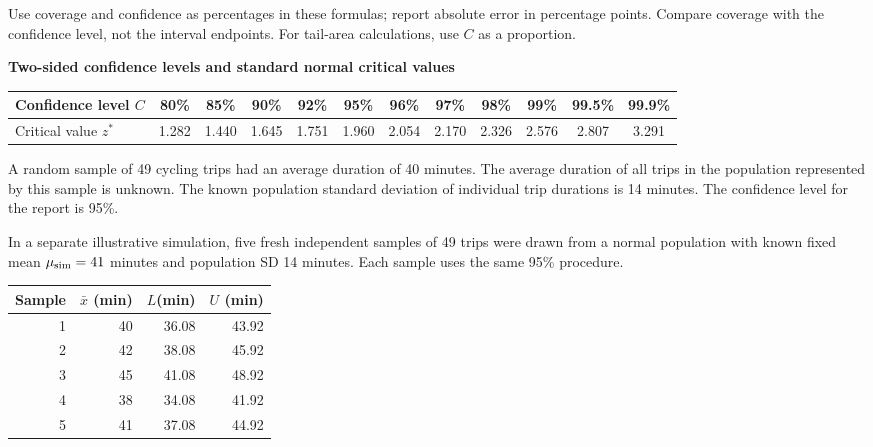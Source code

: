Use coverage and confidence as percentages in these formulas; report absolute error in percentage points. Compare coverage with the confidence level, not the interval endpoints. For tail-area calculations, use $C$ as a proportion.
\begin{center}
\small
\textbf{Two-sided confidence levels and standard normal critical values}\par
\begin{tabularx}{\linewidth}{@{}>{\raggedright\arraybackslash}X*{11}{c}@{}}\toprule
Confidence level $C$&80\%&85\%&90\%&92\%&95\%&96\%&97\%&98\%&99\%&99.5\%&99.9\%\\\midrule
Critical value $z^*$&1.282&1.440&1.645&1.751&1.960&2.054&2.170&2.326&2.576&2.807&3.291\\\bottomrule
\end{tabularx}\end{center}






\InformationTask

\IntervalTask

\CoverageTask

\clearpage
{}

\noindent\begin{minipage}[t]{0.60\linewidth}
\vspace{0pt}
A random sample of 49 cycling trips had an average duration of 40 minutes. The average duration of all trips in the population represented by this sample is unknown. The known population standard deviation of individual trip durations is 14 minutes. The confidence level for the report is 95\%.

In a separate illustrative simulation, five fresh independent samples of 49 trips were drawn from a normal population with known fixed mean $\mu_{\rm sim}=41$ minutes and population SD 14 minutes. Each sample uses the same 95\% procedure.
\end{minipage}\hfill
\begin{minipage}[t]{0.38\linewidth}
\vspace{0pt}
\centering
\begin{tabular}{@{}rrrr@{}}\toprule
Sample&$\bar{x}$ (min)& $L$(min)&$U$ (min)\\\midrule
1&40&36.08&43.92\\
2&42&38.08&45.92\\
3&45&41.08&48.92\\
4&38&34.08&41.92\\
5&41&37.08&44.92\\\bottomrule
\end{tabular}
\end{minipage}\par
{}


